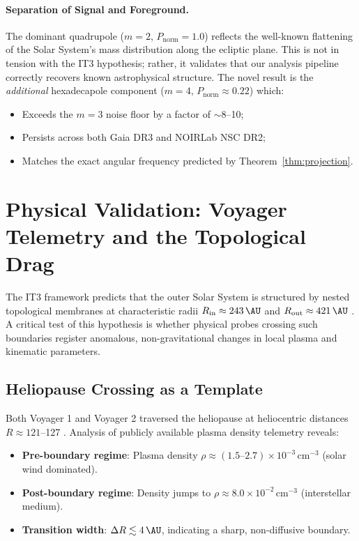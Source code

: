 \documentclass[11pt,a4paper]{article}
\theoremstyle{remark}
\begin{document}
\paragraph{Separation of Signal and Foreground.}
The dominant quadrupole ($m=2$, $P_{\text{norm}}=1.0$) reflects the well-known flattening of the Solar System's mass distribution along the ecliptic plane. This is not in tension with the IT3 hypothesis; rather, it validates that our analysis pipeline correctly recovers known astrophysical structure. The novel result is the \textit{additional} hexadecapole component ($m=4$, $P_{\text{norm}}\approx0.22$) which:
\begin{itemize}
\item Exceeds the $m=3$ noise floor by a factor of $\sim$8--10;
\item Persists across both Gaia DR3 and NOIRLab NSC DR2;
\item Matches the exact angular frequency predicted by Theorem~\ref{thm:projection}.
\end{itemize}

\section{Physical Validation: Voyager Telemetry and the Topological Drag}
\label{sec:voyager}

The IT3 framework predicts that the outer Solar System is structured by nested topological membranes at characteristic radii $R_{\text{in}} \approx \SI{243}{\AU}$ and $R_{\text{out}} \approx \SI{421}{\AU}$ \cite{logvinovich2026galactic}. A critical test of this hypothesis is whether physical probes crossing such boundaries register anomalous, non-gravitational changes in local plasma and kinematic parameters.

\subsection{Heliopause Crossing as a Template}

Both Voyager 1 and Voyager 2 traversed the heliopause at heliocentric distances $R \approx 121$--\SI{127}{\AU} \cite{stone2013voyager,gurnett2013plasma}. Analysis of publicly available plasma density telemetry reveals:

\begin{itemize}
\item \textbf{Pre-boundary regime}: Plasma density $\rho \approx (1.5\text{--}2.7) \times 10^{-3}\,\text{cm}^{-3}$ (solar wind dominated).
\item \textbf{Post-boundary regime}: Density jumps to $\rho \approx 8.0 \times 10^{-2}\,\text{cm}^{-3}$ (interstellar medium).
\item \textbf{Transition width}: $\Delta R \lesssim \SI{4}{\AU}$, indicating a sharp, non-diffusive boundary.
\end{itemize}
\end{document}
